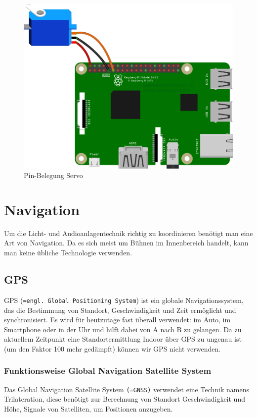 \begin{figure}[H]
	\centering
	\includegraphics[width=0.7\linewidth]{images/Pin_Belegung.png}
	\caption[Pin-Belegung Servo]{Pin-Belegung Servo}
	\label{fig:PIN_Belegung}
\end{figure}
\newpage
\section{Navigation}

Um die Licht- und Audioanlagentechnik richtig zu koordinieren benötigt man eine Art von Navigation. Da es sich meist um Bühnen im Innenbereich handelt, kann man keine übliche Technologie verwenden.

\subsection{GPS}
GPS (\texttt{=engl. Global Positioning System}) ist ein globale Navigationssystem, das die Bestimmung von Standort, Geschwindigkeit und Zeit ermöglicht und synchronisiert. Es wird für heutzutage fast überall verwendet: im Auto, im Smartphone oder in der Uhr und hilft dabei von A nach B zu gelangen. \parencite{GPS} Da zu aktuellem Zeitpunkt eine Standortermittlung Indoor über GPS zu ungenau ist (um den Faktor 100 mehr gedämpft) können wir GPS nicht verwenden. \parencite{Indoor}

\subsubsection{Funktionsweise Global Navigation Satellite System}

Das Global Navigation Satellite System \texttt{(=GNSS)} verwendet eine Technik namens Trilateration, diese benötigt zur Berechnung von Standort Geschwindigkeit und Höhe, Signale von Satelliten, um Positionen anzugeben. 


